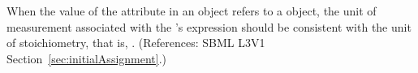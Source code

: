 When the value of the attribute  in an \InitialAssignment
object refers to a \SpeciesReference object, the unit of measurement
associated with the \InitialAssignment's  expression should be
consistent with the unit of stoichiometry, that is, .
(References: SBML L3V1 Section~\ref{sec:initialAssignment}.)
